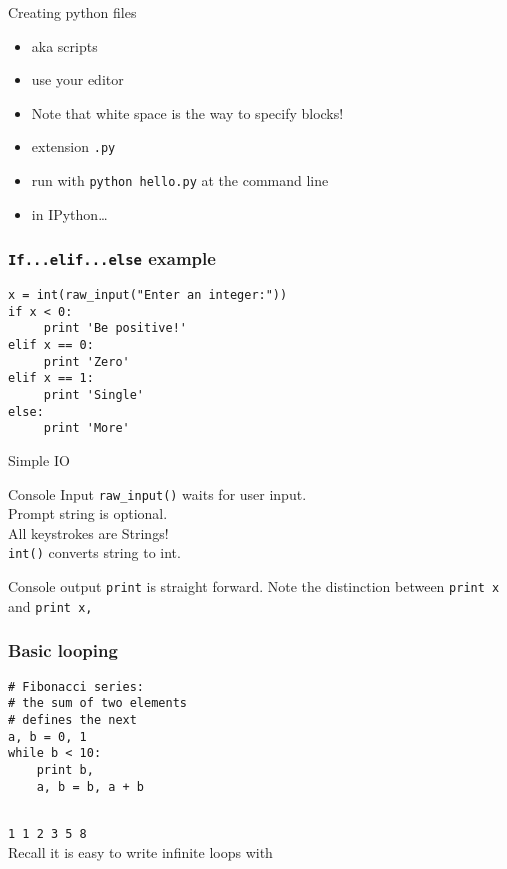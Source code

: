\documentclass[14pt,compress]{beamer}
\newcounter{time}
\newcommand{\inctime}[1]{\addtocounter{time}{#1}{\tiny \thetime\ m}}
\newcommand{\typ}[1]{\texttt{#1}}
\newcommand{\kwrd}[1]{ \texttt{\textbf{\color{blue}{#1}}}  }
\begin{document}
\begin{frame}
  {Creating python files}
  \begin{itemize}
    \item aka scripts
    \item use your editor
    \item Note that white space is the way to specify blocks!
    \item extension \typ{.py}
    \item run with \texttt{python hello.py} at the command line
    \item in IPython\ldots
  \end{itemize}
\end{frame}

\begin{frame}[fragile]
  \frametitle{\typ{If...elif...else} example}
\begin{lstlisting}
x = int(raw_input("Enter an integer:"))
if x < 0:
     print 'Be positive!'
elif x == 0:
     print 'Zero'
elif x == 1:
     print 'Single'
else:
     print 'More'
\end{lstlisting}
\end{frame}

\begin{frame}{Simple IO}
  \begin{block}
    {Console Input}
    \texttt{raw\_input()} waits for user input.\\Prompt string is optional.\\
    All keystrokes are Strings!\\\texttt{int()} converts string to int.
  \end{block}
  \begin{block}
    {Console output}
    \texttt{print} is straight forward. Note the distinction between \texttt{print x} and \texttt{print x,}
  \end{block}
\end{frame}

\begin{frame}[fragile]
  \frametitle{Basic looping}
  \begin{lstlisting}
# Fibonacci series:
# the sum of two elements
# defines the next
a, b = 0, 1
while b < 10:
    print b,
    a, b = b, a + b
 
\end{lstlisting}
\typ{1 1 2 3 5 8}\\  
\alert{Recall it is easy to write infinite loops with \kwrd{while}}
  \inctime{20}
\end{frame}
\end{document}
